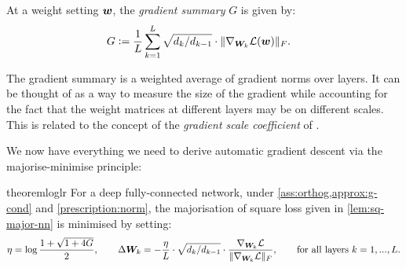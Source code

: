 \begin{definition}\label{def:gsummary}
At a weight setting ${\bm{w}}$, the \textit{gradient summary} $G$ is given by:
\begin{align*}
        G & \vcentcolon= \frac{1}{L}\sum_{k=1}^L \sqrt{d_k/d_{k-1}} \cdot \Vert { \nabla_{{\bm{W}}_k} \mathcal{L}({\bm{w}})} \Vert_F.
\end{align*}
\end{definition}
The gradient summary is a weighted average of gradient norms over layers. It can be thought of as a way to measure the size of the gradient while accounting for the fact that the weight matrices at different layers may be on different scales. This is related to the concept of the \textit{gradient scale coefficient} of \citet{Philipp2017TheEG}.

We now have everything we need to derive automatic gradient descent via the majorise-minimise principle:

\begin{restatable}{theorem}{loglr}\label{thm:log-lr}
For a deep fully-connected network, under \cref{ass:orthog,approx:g-cond} and \cref{prescription:norm}, the majorisation of square loss given in \cref{lem:sq-major-nn} is minimised by setting:
\begin{align*}
    \eta = \log\frac{1 + \sqrt{1+4G}}{2},\qquad
    \Delta {\bm{W}}_k = - \frac{\eta}{L}\cdot \sqrt{d_k/d_{k-1}} \cdot\frac{\nabla_{{\bm{W}}_k} \mathcal{L}}{\Vert {\nabla_{{\bm{W}}_k} \mathcal{L}} \Vert_F}, \qquad \text{for all layers } k=1,...,L.
\end{align*}
\end{restatable}

